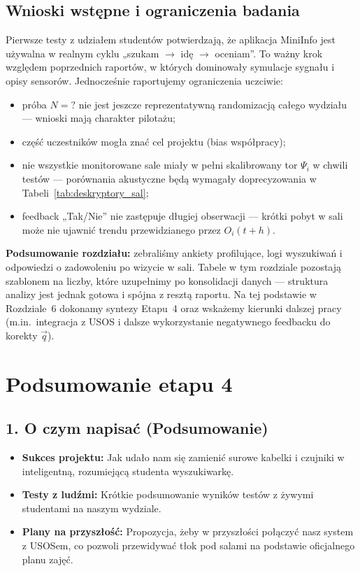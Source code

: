 \documentclass[14pt,a4paper]{extarticle}
\begin{document}
\subsection{Wnioski wstępne i ograniczenia badania}
Pierwsze testy z udziałem studentów potwierdzają, że aplikacja MiniInfo jest używalna w realnym cyklu „szukam $\rightarrow$ idę $\rightarrow$ oceniam”. To ważny krok względem poprzednich raportów, w których dominowały symulacje sygnału i opisy sensorów. Jednocześnie raportujemy ograniczenia uczciwie:
\begin{itemize}
    \item próba $N = \text{?}$ nie jest jeszcze reprezentatywną randomizacją całego wydziału --- wnioski mają charakter pilotażu;
    \item część uczestników mogła znać cel projektu (bias współpracy);
    \item nie wszystkie monitorowane sale miały w pełni skalibrowany tor $\Psi_i$ w chwili testów --- porównania akustyczne będą wymagały doprecyzowania w Tabeli~\ref{tab:deskryptory_sal};
    \item feedback „Tak/Nie” nie zastępuje długiej obserwacji --- krótki pobyt w sali może nie ujawnić trendu przewidzianego przez $O_i(t+h)$.
\end{itemize}

\textbf{Podsumowanie rozdziału:} zebraliśmy ankiety profilujące, logi wyszukiwań i odpowiedzi o zadowoleniu po wizycie w sali. Tabele w tym rozdziale pozostają szablonem na liczby, które uzupełnimy po konsolidacji danych --- struktura analizy jest jednak gotowa i spójna z resztą raportu. Na tej podstawie w Rozdziale~6 dokonamy syntezy Etapu~4 oraz wskażemy kierunki dalszej pracy (m.in.\ integracja z USOS i dalsze wykorzystanie negatywnego feedbacku do korekty $\vec{q}$).

\section{Podsumowanie etapu 4}

\subsection*{1. O czym napisać (Podsumowanie)}
\begin{itemize}
    \item \textbf{Sukces projektu:} Jak udało nam się zamienić surowe kabelki i czujniki w inteligentną, rozumiejącą studenta wyszukiwarkę.
    \item \textbf{Testy z ludźmi:} Krótkie podsumowanie wyników testów z żywymi studentami na naszym wydziale.
    \item \textbf{Plany na przyszłość:} Propozycja, żeby w przyszłości połączyć nasz system z USOSem, co pozwoli przewidywać tłok pod salami na podstawie oficjalnego planu zajęć.
\end{itemize}
\end{document}
